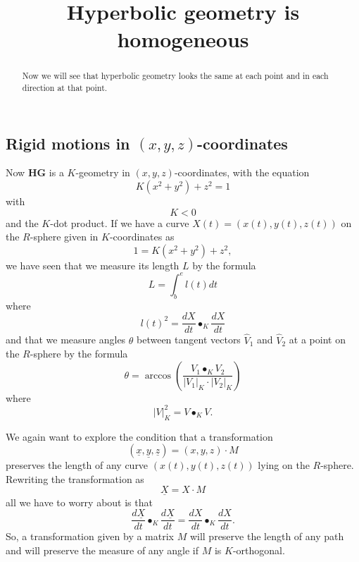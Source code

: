 \documentclass{ximera}
\title{Hyperbolic geometry is homogeneous}
\begin{document}
\begin{abstract}
Now we will see that hyperbolic geometry looks the same at each point
and in each direction at that point.
\end{abstract}
\maketitle


\subsection*{Rigid motions in $\left(  x,y,z\right)  $-coordinates}

Now \textbf{HG} is a $K$-geometry in $\left( x,y,z\right) $-coordinates, with the equation
\begin{equation}
K\left(  x^{2}+y^{2}\right)  +z^{2}=1 \label{83}%
\end{equation}
with%
\[
K<0
\]
and the $K$-dot product. If we have a curve $X\left( t\right) =\left(
x\left( t\right) ,y\left( t\right) ,z\left( t\right) \right) $ on the
$R$-sphere given in $K$-coordinates as%
\[
1=K\left(  x^{2}+y^{2}\right)  +z^{2},
\]
we have seen that we measure its length $L$ by the formula%
\begin{equation}
L={\displaystyle\int\nolimits_{b}^{e}}
l\left(  t\right)  dt \label{84}%
\end{equation}
where
\begin{equation}
l\left(  t\right)  ^{2}=\frac{dX}{dt}\bullet_{K}\frac{dX}{dt} \label{85}%
\end{equation}
and that we measure angles $\theta$ between tangent vectors
$\hat{V}_{1}$ and $\hat{V}_{2}$ at a point on the $R$-sphere by the
formula%
\[
\theta=\arccos \left(  \frac{V_{1}\bullet_{K}V_{2}}{\left\vert
V_{1}\right\vert _{K}\cdot\left\vert V_{2}\right\vert
_{K}}\right)
\]
where%
\[
\left\vert V\right\vert _{K}^{2}=V\bullet_{K}V.
\]


We again want to explore the condition that a transformation%
\[
\left(  \underline{x},\underline{y},\underline{z}\right)  =\left(
x,y,z\right)  \cdot M
\]
preserves the length of any curve $\left( x\left( t\right) ,y\left(
t\right) ,z\left( t\right) \right) $ lying on the
$R$-sphere. Rewriting the transformation as%
\[
\underline{X}=X\cdot M
\]
all we have to worry about is that%
\[
\frac{d\underline{X}}{dt}\bullet_{K}\frac{d\underline{X}}{dt}=\frac{dX}%
{dt}\bullet_{K}\frac{dX}{dt}.
\]
So, %
a transformation given by a
matrix $M$ will preserve the length of any path and will preserve the
measure of any angle if $M$ is $K$-orthogonal.
\end{document}
